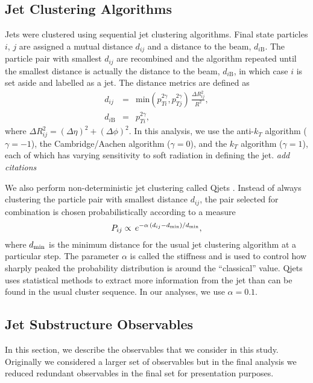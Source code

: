 \subsection{Jet Clustering Algorithms}

Jets were clustered using sequential jet clustering algorithms. Final state particles $i$, $j$ are assigned a mutual distance $d_{ij}$ and a distance to the beam, $d_{i\mathrm{B}}$. The particle pair with smallest $d_{ij}$ are  recombined and the algorithm repeated until the smallest distance is actually the distance to the beam, $d_{i\mathrm{B}}$, in which case $i$ is set aside and labelled as a jet. The distance metrics are defined as
%
\begin{eqnarray}
d_{ij} &=& \mathrm{min}(p_{Ti}^{2\gamma},p_{Tj}^{2\gamma})\,\frac{\Delta R_{ij}^2}{R^2},\\
d_{i\mathrm{B}} &=& p_{Ti}^{2\gamma},
\end{eqnarray}
%
where $\Delta R_{ij}^2=(\Delta \eta)^2+(\Delta\phi)^2$. In this analysis, we use the anti-$k_T$ algorithm ($\gamma=-1$), the Cambridge/Aachen algorithm ($\gamma=0$), and the $k_T$ algorithm ($\gamma=1$), each of which has varying sensitivity to soft radiation in defining the jet. \emph{add citations} 

We also perform non-deterministic jet clustering  called Qjets \cite{?}. Instead of always clustering the particle pair with smallest distance $d_{ij}$, the pair selected for combination is chosen probabilistically according to a measure
%
\begin{equation}
P_{ij} \propto \,e^{-\alpha \,(d_{ij}-d_{\rm min})/d_{\rm min}},
\end{equation}
%
where $d_{\rm min}$ is the minimum distance for the usual jet clustering algorithm at a particular step. The parameter $\alpha$ is called the stiffness and is used to control how sharply peaked the probability distribution is around the ``classical'' value. Qjets uses statistical methods to extract more information from the jet than can be found in the usual cluster sequence. In our analyses, we use $\alpha=0.1$.

\subsection{Jet Substructure Observables}


\noindent
In this section, we describe the observables that we consider in this study.  
Originally we considered a larger set of observables but in the final analysis we reduced redundant observables in the final set for presentation purposes. \\

